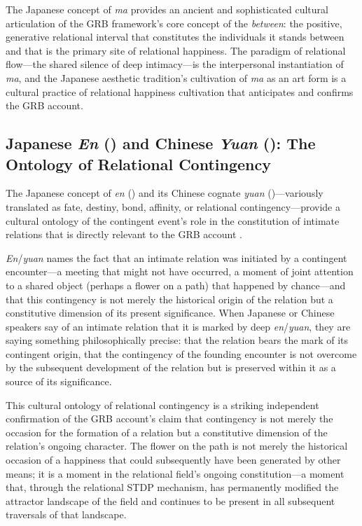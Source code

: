 \begin{claim}
The Japanese concept of \emph{ma} provides an ancient and sophisticated cultural articulation of the GRB framework's core concept of the \emph{between}: the positive, generative relational interval that constitutes the individuals it stands between and that is the primary site of relational happiness. The paradigm of relational flow---the shared silence of deep intimacy---is the interpersonal instantiation of \emph{ma}, and the Japanese aesthetic tradition's cultivation of \emph{ma} as an art form is a cultural practice of relational happiness cultivation that anticipates and confirms the GRB account.
\end{claim}

\subsection{Japanese \emph{En} () and Chinese \emph{Yuan} (): The Ontology of Relational Contingency}
\label{p14:subsec:en}

\noindent
The Japanese concept of \emph{en} () and its Chinese cognate \emph{yuan} ()---variously translated as fate, destiny, bond, affinity, or relational contingency---provide a cultural ontology of the contingent event's role in the constitution of intimate relations that is directly relevant to the GRB account \parencite{nishida1990}.

\emph{En}/\emph{yuan} names the fact that an intimate relation was initiated by a contingent encounter---a meeting that might not have occurred, a moment of joint attention to a shared object (perhaps a flower on a path) that happened by chance---and that this contingency is not merely the historical origin of the relation but a constitutive dimension of its present significance. When Japanese or Chinese speakers say of an intimate relation that it is marked by deep \emph{en}/\emph{yuan}, they are saying something philosophically precise: that the relation bears the mark of its contingent origin, that the contingency of the founding encounter is not overcome by the subsequent development of the relation but is preserved within it as a source of its significance.

This cultural ontology of relational contingency is a striking independent confirmation of the GRB account's claim that contingency is not merely the occasion for the formation of a relation but a constitutive dimension of the relation's ongoing character. The flower on the path is not merely the historical occasion of a happiness that could subsequently have been generated by other means; it is a moment in the relational field's ongoing constitution---a moment that, through the relational STDP mechanism, has permanently modified the attractor landscape of the field and continues to be present in all subsequent traversals of that landscape.

